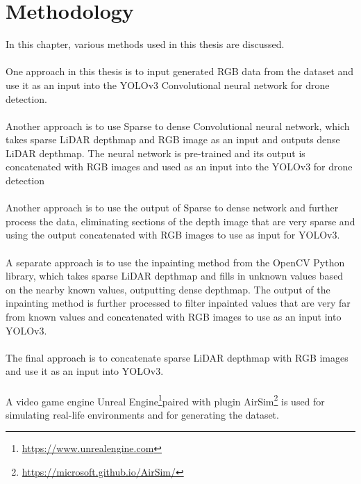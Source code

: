 \documentclass[twoside]{ctuthesis}
\theoremstyle{plain}
\theoremstyle{definition}
\theoremstyle{note}
\begin{document}
\chapter{Methodology}
In this chapter, various methods used in this thesis are discussed.\\
\\
One approach in this thesis is to input generated RGB data from the dataset and use it as an input into the YOLOv3 Convolutional neural network for drone detection.\\
\\
Another approach is to use Sparse to dense Convolutional neural network, which takes sparse LiDAR depthmap and RGB image as an input and outputs dense LiDAR depthmap. The neural network is pre-trained and its output is concatenated with RGB images and used as an input into the YOLOv3  for drone detection\\
\\
Another approach is to use the output of Sparse to dense network and further process the data, eliminating sections of the depth image that are very sparse and using the output concatenated with RGB images to use as input for YOLOv3.\\
\\
A separate approach is to use the inpainting method from the OpenCV Python library, which takes sparse LiDAR depthmap and fills in unknown values based on the nearby known values, outputting dense depthmap. The output of the inpainting method is further processed to filter inpainted values that are very far from known values and concatenated with RGB images to use as an input into YOLOv3.\\
\\
The final approach is to concatenate sparse LiDAR depthmap with RGB images and use it as an input into YOLOv3.\\
\\
A video game engine Unreal Engine\footnote{\url{https://www.unrealengine.com}}paired with plugin AirSim\footnote{\url{https://microsoft.github.io/AirSim/}} is used for simulating real-life environments and for generating the dataset.
\end{document}
